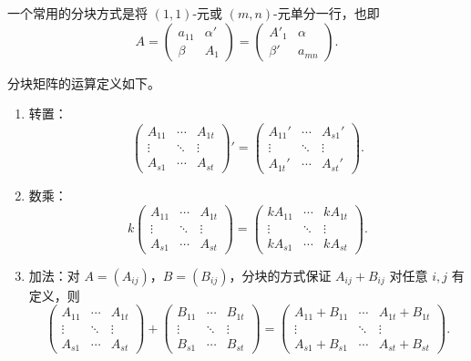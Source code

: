 一个常用的分块方式是将 $(1,1)$-元或 $(m,n)$-元单分一行，也即
\[
A=\begin{pmatrix}
	a_{11}&\alpha'\\
	\beta&A_1
\end{pmatrix}
=\begin{pmatrix}
	A'_1&\alpha\\
	\beta'&a_{mn}
\end{pmatrix}.
\]

分块矩阵的运算定义如下。

\begin{definition}\label{3.5.3}
	\begin{enumerate}
		\item 转置：
		\[
		\begin{pmatrix}
			A_{11}&\cdots&A_{1t}\\
			\vdots&\ddots&\vdots\\
			A_{s1}&\cdots&A_{st}
		\end{pmatrix}'
		=
		\begin{pmatrix}
			A_{11}'&\cdots&A_{s1}'\\
			\vdots&\ddots&\vdots\\
			A_{1t}'&\cdots&A_{st}'
		\end{pmatrix}.
		\]
		
		\item 数乘：
		\[
		k\begin{pmatrix}
			A_{11}&\cdots&A_{1t}\\
			\vdots&\ddots&\vdots\\
			A_{s1}&\cdots&A_{st}
		\end{pmatrix}
		=
		\begin{pmatrix}
			kA_{11}&\cdots&kA_{1t}\\
			\vdots&\ddots&\vdots\\
			kA_{s1}&\cdots&kA_{st}
		\end{pmatrix}.
		\]
		
		\item 加法：对 $A=(A_{ij})$，$B=(B_{ij})$，分块的方式保证 $A_{ij}+B_{ij}$ 对任意 $i,j$ 有定义，则
		\[
		\begin{pmatrix}
			A_{11}&\cdots&A_{1t}\\
			\vdots&\ddots&\vdots\\
			A_{s1}&\cdots&A_{st}
		\end{pmatrix}
		+
		\begin{pmatrix}
			B_{11}&\cdots&B_{1t}\\
			\vdots&\ddots&\vdots\\
			B_{s1}&\cdots&B_{st}
		\end{pmatrix}
		=
		\begin{pmatrix}
			A_{11}+B_{11}&\cdots&A_{1t}+B_{1t}\\
			\vdots&\ddots&\vdots\\
			A_{s1}+B_{s1}&\cdots&A_{st}+B_{st}
		\end{pmatrix}.
		\]
		

\end{enumerate}
\end{definition}
